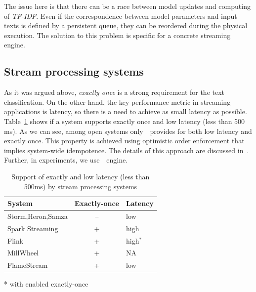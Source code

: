The issue here is that there can be a race between model updates and computing of {\em TF-IDF}. Even if the correspondence between model parameters and input texts is defined by a persistent queue, they can be reordered during the physical execution. The solution to this problem is specific for a concrete streaming engine.

\subsection{Stream processing systems}

As it was argued above, {\em exactly once} is a strong requirement for the text classification. On the other hand, the key performance metric in streaming applications is latency, so there is a need to achieve as small latency as possible. Table~\ref{comparison} shows if a system supports exactly once and low latency (less than 500 ms). As we can see, among open systems only~\FlameStream\ provides for both low latency and exactly once. This property is achieved using optimistic order enforcement that implies system-wide idempotence. The details of this approach are discussed in~\cite{we2018adbis, we2018beyondmr}. Further, in experiments, we use~\FlameStream\ engine.

\begin{table}[htbp]
\caption{Support of exactly and low latency (less than 500ms) by stream processing systems}
\begin{threeparttable}
\begin{tabular}{lcl}
System             & Exactly-once & Latency    \\
\hline
Storm,Heron,Samza  &    --         &   low            \\
Spark Streaming    &    +          &   high           \\
Flink              &    +          &   high$^*$       \\
MillWheel          &    +          &   NA             \\
FlameStream        &    +          &   low            \\
\end{tabular}
* with enabled exactly-once~\cite{we2018beyondmr}
\end{threeparttable}
\label{comparison}
\vspace{-6mm}
\end{table}
